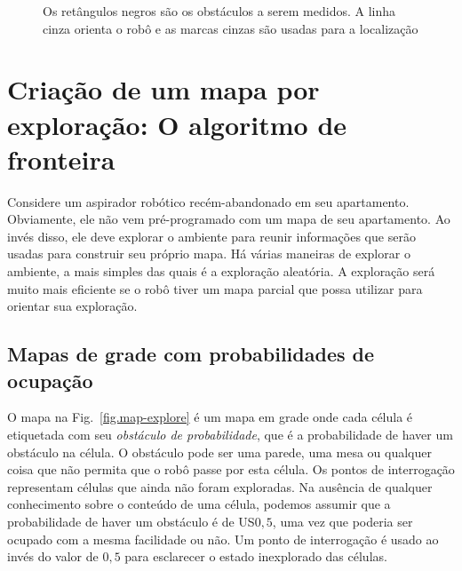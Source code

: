 \begin{figure}
\begin{center}
\end{center}
\caption{Os retângulos negros são os obstáculos a serem medidos. A linha cinza orienta o robô e as marcas cinzas são usadas para a localização}\label{fig.mapping-activity}
\end{figure}

\section[O algoritmo de fronteira]{Criação de um mapa por exploração: O algoritmo de fronteira}\label{s.map-create}

Considere um aspirador robótico recém-abandonado em seu apartamento. Obviamente, ele não vem pré-programado com um mapa de seu apartamento. Ao invés disso, ele deve explorar o ambiente para reunir informações que serão usadas para construir seu próprio mapa. Há várias maneiras de explorar o ambiente, a mais simples das quais é a exploração aleatória. A exploração será muito mais eficiente se o robô tiver um mapa parcial que possa utilizar para orientar sua exploração.

\subsection{Mapas de grade com probabilidades de ocupação}

O mapa na Fig.~\ref{fig.map-explore} é um mapa em grade onde cada célula é etiquetada com seu \emph{obstáculo de probabilidade}, que é a probabilidade de haver um obstáculo na célula. O obstáculo pode ser uma parede, uma mesa ou qualquer coisa que não permita que o robô passe por esta célula. Os pontos de interrogação representam células que ainda não foram exploradas. Na ausência de qualquer conhecimento sobre o conteúdo de uma célula, podemos assumir que a probabilidade de haver um obstáculo é de US$ 0,5$, uma vez que poderia ser ocupado com a mesma facilidade ou não. Um ponto de interrogação é usado ao invés do valor de $0,5$ para esclarecer o estado inexplorado das células.

